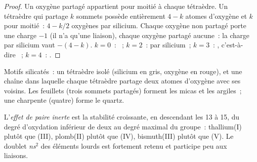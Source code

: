 \begin{proof}
Un oxygène partagé appartient pour moitié à chaque tétraèdre. Un
tétraèdre qui partage
$k$ sommets possède entièrement $4 - k$ atomes d'oxygène et $k$ pour
moitié~: $4 -
k/2$ oxygènes par silicium. Chaque oxygène non partagé porte une charge
$-1$ (il n'a qu'une liaison), chaque oxygène partagé aucune~: la charge
par silicium vaut
$-(4 - k)$. $k = 0$~: ~; $k = 2$~:  par
silicium~;
$k = 3$~: , c'est-à-dire ~; $k = 4$~: .
\end{proof}

\begin{omfigure}

{\small Motifs silicatés~: un tétraèdre  isolé (silicium en
gris, oxygène en rouge), et une chaîne dans laquelle chaque tétraèdre
partage deux atomes d'oxygène avec ses voisins. Les feuillets (trois
sommets partagés) forment les micas et les argiles~; une charpente
(quatre) forme le quartz.}
\end{omfigure}

\begin{definition}\label{def:b1:p-block-13-15:inert-pair}
L'\emph{effet de paire inerte} est la
stabilité croissante, en descendant les  13 à 15, du degré
d'oxydation inférieur de deux au degré maximal du groupe~: thallium(I)
plutôt que (III), plomb(II) plutôt que (IV), bismuth(III) plutôt que
(V). Le doublet \textit{ns}$^2$ des éléments lourds est fortement retenu
et participe peu aux liaisons.
\end{definition}

